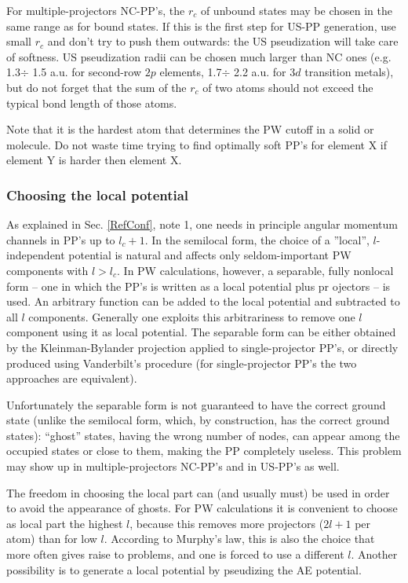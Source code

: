 \documentclass[12pt]{article}
\begin{document}
For multiple-projectors NC-PP's, the $r_c$ of unbound states may be chosen 
in the same range as for bound states. If this is the first step for US-PP 
generation, use small $r_c$ and don't try to push them outwards: the
US pseudization will take care of softness. US pseudization radii can 
be chosen much larger than NC ones (e.g. 1.3$\div$ 1.5 a.u. for second-row
$2p$ elements, 1.7$\div$ 2.2 a.u. for $3d$ transition metals), but do not
forget that the sum of the $r_c$ of two atoms should not exceed the typical
bond length of those atoms.

Note that it is the hardest atom that determines the PW cutoff in a
solid or molecule. Do not waste time trying to find optimally soft 
PP's for element X if element Y is harder then element X.

\subsubsection{Choosing the local potential}

As explained in Sec. \ref{RefConf}, note 1, one needs in principle
angular momentum channels in PP's up to $l_c+1$. In the semilocal
form, the choice of a ''local'', $l$-independent potential is natural
and affects only seldom-important PW components with $l> l_c$.
In PW calculations, however, a separable, fully nonlocal form -- 
one in which the PP's is written as a local potential plus pr
ojectors -- is used.
An arbitrary function can be added to the local potential and 
subtracted to all $l$ components. Generally one exploits this 
arbitrariness to remove one $l$ component using it as local potential.
The separable form can be either obtained by the Kleinman-Bylander
projection \cite{KB} applied to single-projector PP's, or directly 
produced using Vanderbilt's procedure \cite{van} (for single-projector
PP's the two approaches are equivalent).

Unfortunately the separable form is not guaranteed to have the
correct ground state (unlike the semilocal form, which, by construction,
has the correct ground states): ``ghost'' states, having the wrong number 
of nodes, 
can appear among the occupied states or close to them, making the 
PP completely useless. This problem may show up in multiple-projectors 
NC-PP's and in US-PP's as well.

The freedom in choosing the local part can (and usually must) be used 
in order to avoid the appearance of ghosts. For PW calculations it is 
convenient to choose as local part the highest $l$, because this removes
more projectors ($2l+1$ per atom) than for low $l$. According to Murphy's 
law, this is also the choice that more often gives raise to problems, 
and one is forced to use a different $l$. Another possibility is to generate 
a local potential by pseudizing the AE potential.
\end{document}
